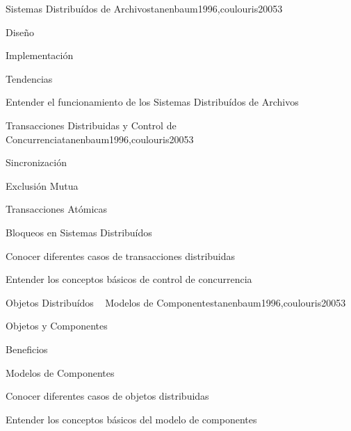 \begin{syllabus}
\begin{unit}{Sistemas Distribuídos de Archivos}{tanenbaum1996,coulouris2005}{3}
   \begin{topics}
      \item Diseño
      \item Implementación
      \item Tendencias
   \end{topics}

   \begin{unitgoals}
      \item Entender el funcionamiento de los Sistemas Distribuídos de Archivos
   \end{unitgoals}
\end{unit}

\begin{unit}{Transacciones Distribuidas y Control de Concurrencia}{tanenbaum1996,coulouris2005}{3}
   \begin{topics}
      \item Sincronización
      \item Exclusión Mutua
      \item Transacciones Atómicas
      \item Bloqueos en Sistemas Distribuídos
   \end{topics}

   \begin{unitgoals}
      \item Conocer diferentes casos de transacciones distribuidas
      \item Entender los conceptos básicos de control de concurrencia
      \item 
   \end{unitgoals}
\end{unit}

\begin{unit}{Objetos Distribuídos ~ Modelos de Componentes}{tanenbaum1996,coulouris2005}{3}
   \begin{topics}
      \item Objetos y Componentes
      \item Beneficios
      \item Modelos de Componentes
   \end{topics}

   \begin{unitgoals}
      \item Conocer diferentes casos de objetos distribuidas
      \item Entender los conceptos básicos del modelo de componentes
   \end{unitgoals}
\end{unit}


\end{syllabus}
